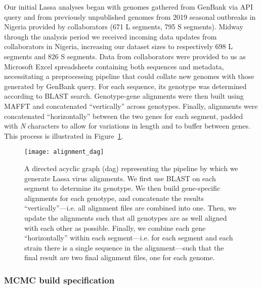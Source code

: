 Our initial Lassa analyses began with genomes gathered from GenBank via API query and from previously unpublished genomes from 2019 seasonal outbreaks in Nigeria provided by collaborators (671 L segments, 795 S segments)\cite{kafetzopoulou2019metagenomic}.
Midway through the analysis period we received incoming data updates from collaborators in Nigeria, increasing our dataset sizes to respectively 698 L segments and 826 S segments.
Data from collaborators were provided to us as Microsoft Excel spreadsheets containing both sequences and metadata, necessitating a preprocessing pipeline that could collate new genomes with those generated by GenBank query.
For each sequence, its genotype was determined according to BLAST\cite{boratyn2013blast} search.
Genotype-gene alignments were then built using MAFFT and concatenated ``vertically'' across genotypes.
Finally, alignments were concatenated ``horizontally'' between the two genes for each segment, padded with \textit{N} characters to allow for variations in length and to buffer between genes.
This process is illustrated in Figure~\ref{fig:alignment_dag}.

\begin{figure}[ht]
  \centering
  \medskip
  \texttt{[image: alignment\_dag]}
  \caption[Lassa alignment pipeline]{A directed acyclic graph (\gls{dag}) representing the pipeline by which we generate Lassa virus alignments. We first use BLAST on each segment to determine its genotype. We then build gene-specific alignments for each genotype, and concatenate the results ``vertically''---i.e. all alignment files are combined into one. Then, we update the alignments such that all genotypes are as well aligned with each other as possible. Finally, we combine each gene ``horizontally'' within each segment---i.e. for each segment and each strain there is a single sequence in the alignment---such that the final result are two final alignment files, one for each genome.}
  \label{fig:alignment_dag}
\end{figure}

\subsubsection{MCMC build specification}

